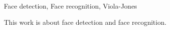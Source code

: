 \begin{englishabstract}{}{Face detection, Face recognition, Viola-Jones}

    This work is about face detection and face recognition.

\end{englishabstract}
